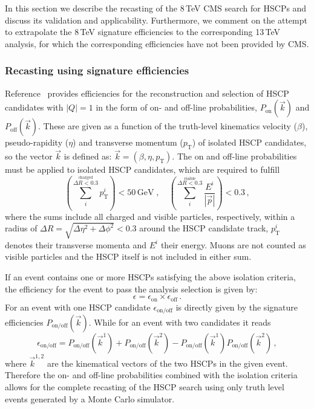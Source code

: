 In this section we describe the recasting of the 8\,TeV CMS
search for HSCPs and discuss its validation and applicability.
Furthermore, we comment on the attempt to extrapolate
the 8\,TeV signature efficiencies to the corresponding 13\,TeV analysis, for
which the corresponding efficiencies have not been provided by CMS\@.


\subsubsection{Recasting using signature efficiencies}\label{sec:signatureeff}

Reference~\cite{Khachatryan:2015lla} provides efficiencies for the reconstruction 
and selection of HSCP candidates with $|Q|=1$ in the form of on- and
off-line probabilities, $P_\text{on}(\vec{k})$ and $P_\text{off}(\vec{k})$.
These are given as a function of the truth-level kinematics 
velocity ($\beta$), pseudo-rapidity ($\eta$) and 
transverse momentum ($p_\text{T}$) of isolated HSCP candidates, so
the vector $\vec{k}$ is defined as: $\vec{k}=(\beta,\eta,p_\text{T})$.
The on and off-line probabilities must be applied to 
isolated HSCP candidates, which are required to fulfill
\begin{equation}
\left( \sum_{i}^{\stackrel{\text{charged}}{\Delta R<0.3}} \!p_\text{T}^{i}
\right)  < 50\,\text{GeV}
\;,\quad
\left(
\sum_{i}^{\stackrel{\text{visible}}{\Delta R<0.3}}  \frac{E^i}{
|\vec{p}|} \right)  < 0.3\,,
\label{eq:GenTkIso1}
\end{equation}
where the sums include all charged and visible particles, respectively,
within a radius of $\Delta R=\sqrt{\Delta\eta^2+\Delta \phi^2}<0.3$ around the
HSCP candidate track, $p_\text{T}^{i}$ denotes their transverse momenta and $E^i$ 
their energy. Muons are not counted as visible particles and the HSCP itself 
is not included in either sum. 


If an event contains one or more HSCPs satisfying the above isolation
criteria, the efficiency for the event to pass the analysis selection is
given by:
\begin{equation}
\label{eq:Technique}
\epsilon = \epsilon_{\text{on}} \times \epsilon_{\text{off}}
\,.
\end{equation}
For an event with one HSCP candidate $\epsilon_{\text{on/off}}$ is
directly given by the signature efficiencies $P_{\text{on/off}}(\vec{k})$.
While for an event with two candidates it reads~\cite{Khachatryan:2015lla}
\begin{equation}
\label{eq:EventAcceptance}
\epsilon_{\text{on}/\text{off}}
= P_{\text{on}/\text{off}}(\vec{k}^1)  + P_{\text{on}/\text{off}}(\vec{k}^2) 
- P_{\text{on}/\text{off}}(\vec{k}^1)  P_{\text{on}/\text{off}}(\vec{k}^2)  \,,
\end{equation}
where $\vec{k}^{1,2}$ are the kinematical vectors of the two HSCPs in the given
event. Therefore the on- and off-line probabilities combined with the isolation
criteria allows for the complete recasting of the HSCP search using only truth
level events generated by a Monte Carlo simulator.


